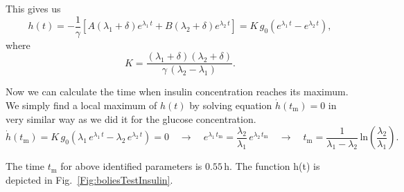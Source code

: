 \documentclass{article}
\providecommand{\m}[1]{\ensuremath{\mathrm{#1}}}
\begin{document}
This gives us
\begin{equation}
	h(t) = -\frac{1}{\gamma}\left[   A(\lambda_1 + \delta)e^{\lambda_1\,t} + B(\lambda_2 + \delta)e^{\lambda_2\,t}  \right] = K\,g_0 \left(e^{\lambda_1\,t} - e^{\lambda_2\,t} \right),
\end{equation}
where $$K=\frac{(\lambda_1+\delta)(\lambda_2+\delta)}{\gamma\,(\lambda_2-\lambda_1)}.$$

Now we can calculate the time when insulin concentration reaches its maximum. We simply find a local maximum of $h(t)$ by solving equation $\dot{h}(t_\m{m})=0$ in very similar way as we did it for the glucose concentration.
\begin{equation*}
	\dot{h}(t_\m{m}) = K\,g_0 \left( \lambda_1\,e^{\lambda_1 \, t} - \lambda_2\,e^{\lambda_2 \, t} \right) = 0		\quad\to\quad
	e^{\lambda_1\,t_\m{m}} = \frac{\lambda_2}{\lambda_1}\,e^{\lambda_2\,t_\m{m}} 	\quad\to\quad
	t_\m{m} = \frac{1}{\lambda_1 - \lambda_2}\,\m{ln}\left(\frac{\lambda_2}{\lambda_1}\right).
\end{equation*}

The time $t_\m{m}$ for above identified parameters is $0.55\,\si{\hour}$. The function h(t) is depicted in Fig.~\ref{Fig:boliesTestInsulin}.
\end{document}
